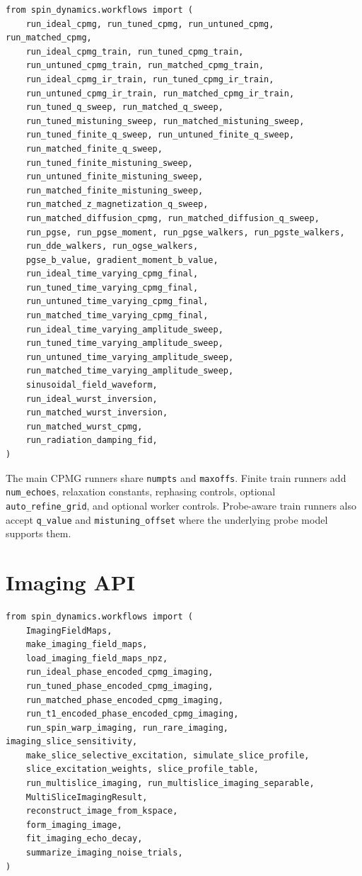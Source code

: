 \documentclass[11pt,oneside]{report}
\newcommand{\code}[1]{\texttt{#1}}
\begin{document}
\begin{lstlisting}
from spin_dynamics.workflows import (
    run_ideal_cpmg, run_tuned_cpmg, run_untuned_cpmg, run_matched_cpmg,
    run_ideal_cpmg_train, run_tuned_cpmg_train,
    run_untuned_cpmg_train, run_matched_cpmg_train,
    run_ideal_cpmg_ir_train, run_tuned_cpmg_ir_train,
    run_untuned_cpmg_ir_train, run_matched_cpmg_ir_train,
    run_tuned_q_sweep, run_matched_q_sweep,
    run_tuned_mistuning_sweep, run_matched_mistuning_sweep,
    run_tuned_finite_q_sweep, run_untuned_finite_q_sweep,
    run_matched_finite_q_sweep,
    run_tuned_finite_mistuning_sweep,
    run_untuned_finite_mistuning_sweep,
    run_matched_finite_mistuning_sweep,
    run_matched_z_magnetization_q_sweep,
    run_matched_diffusion_cpmg, run_matched_diffusion_q_sweep,
    run_pgse, run_pgse_moment, run_pgse_walkers, run_pgste_walkers,
    run_dde_walkers, run_ogse_walkers,
    pgse_b_value, gradient_moment_b_value,
    run_ideal_time_varying_cpmg_final,
    run_tuned_time_varying_cpmg_final,
    run_untuned_time_varying_cpmg_final,
    run_matched_time_varying_cpmg_final,
    run_ideal_time_varying_amplitude_sweep,
    run_tuned_time_varying_amplitude_sweep,
    run_untuned_time_varying_amplitude_sweep,
    run_matched_time_varying_amplitude_sweep,
    sinusoidal_field_waveform,
    run_ideal_wurst_inversion,
    run_matched_wurst_inversion,
    run_matched_wurst_cpmg,
    run_radiation_damping_fid,
)
\end{lstlisting}

The main CPMG runners share \code{numpts} and \code{maxoffs}. Finite train
runners add \code{num\_echoes}, relaxation constants, rephasing controls,
optional \code{auto\_refine\_grid}, and optional worker controls. Probe-aware
train runners also accept \code{q\_value} and \code{mistuning\_offset} where the
underlying probe model supports them.

\section{Imaging API}

\begin{lstlisting}
from spin_dynamics.workflows import (
    ImagingFieldMaps,
    make_imaging_field_maps,
    load_imaging_field_maps_npz,
    run_ideal_phase_encoded_cpmg_imaging,
    run_tuned_phase_encoded_cpmg_imaging,
    run_matched_phase_encoded_cpmg_imaging,
    run_t1_encoded_phase_encoded_cpmg_imaging,
    run_spin_warp_imaging, run_rare_imaging, imaging_slice_sensitivity,
    make_slice_selective_excitation, simulate_slice_profile,
    slice_excitation_weights, slice_profile_table,
    run_multislice_imaging, run_multislice_imaging_separable,
    MultiSliceImagingResult,
    reconstruct_image_from_kspace,
    form_imaging_image,
    fit_imaging_echo_decay,
    summarize_imaging_noise_trials,
)
\end{lstlisting}
\end{document}
